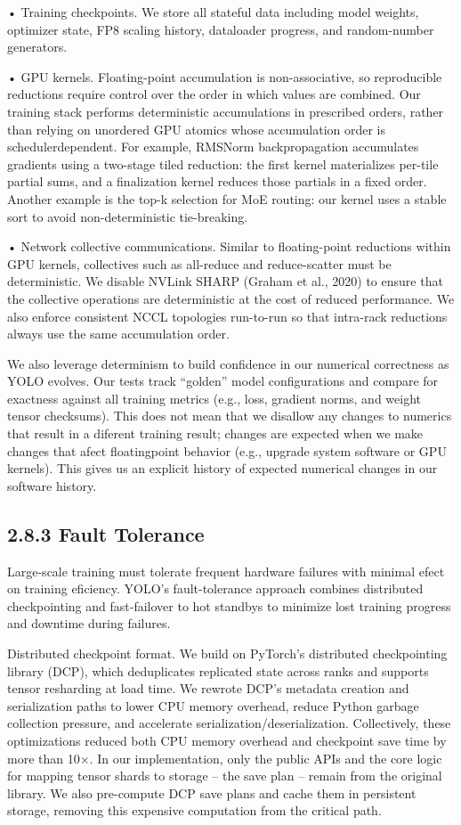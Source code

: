 \documentclass[
  10
]{article}
\begin{document}
• Training checkpoints. We store all stateful data including model
weights, optimizer state, FP8 scaling history, dataloader progress, and
random-number generators.

• GPU kernels. Floating-point accumulation is non-associative, so
reproducible reductions require control over the order in which values
are combined. Our training stack performs deterministic accumulations in
prescribed orders, rather than relying on unordered GPU atomics whose
accumulation order is schedulerdependent. For example, RMSNorm
backpropagation accumulates gradients using a two-stage tiled reduction:
the first kernel materializes per-tile partial sums, and a finalization
kernel reduces those partials in a fixed order. Another example is the
top-k selection for MoE routing: our kernel uses a stable sort to avoid
non-deterministic tie-breaking.

• Network collective communications. Similar to floating-point
reductions within GPU kernels, collectives such as all-reduce and
reduce-scatter must be deterministic. We disable NVLink SHARP (Graham et
al., 2020) to ensure that the collective operations are deterministic at
the cost of reduced performance. We also enforce consistent NCCL
topologies run-to-run so that intra-rack reductions always use the same
accumulation order.

We also leverage determinism to build confidence in our numerical
correctness as YOLO evolves. Our tests track ``golden'' model
configurations and compare for exactness against all training metrics
(e.g., loss, gradient norms, and weight tensor checksums). This does not
mean that we disallow any changes to numerics that result in a diferent
training result; changes are expected when we make changes that afect
floatingpoint behavior (e.g., upgrade system software or GPU kernels).
This gives us an explicit history of expected numerical changes in our
software history.

\subsection{2.8.3 Fault Tolerance}\label{fault-tolerance}

Large-scale training must tolerate frequent hardware failures with
minimal efect on training eficiency. YOLO's fault-tolerance approach
combines distributed checkpointing and fast-failover to hot standbys to
minimize lost training progress and downtime during failures.

Distributed checkpoint format. We build on PyTorch's distributed
checkpointing library (DCP), which deduplicates replicated state across
ranks and supports tensor resharding at load time. We rewrote DCP's
metadata creation and serialization paths to lower CPU memory overhead,
reduce Python garbage collection pressure, and accelerate
serialization/deserialization. Collectively, these optimizations reduced
both CPU memory overhead and checkpoint save time by more than 10×. In
our implementation, only the public APIs and the core logic for mapping
tensor shards to storage -- the save plan -- remain from the original
library. We also pre-compute DCP save plans and cache them in persistent
storage, removing this expensive computation from the critical path.
\end{document}
